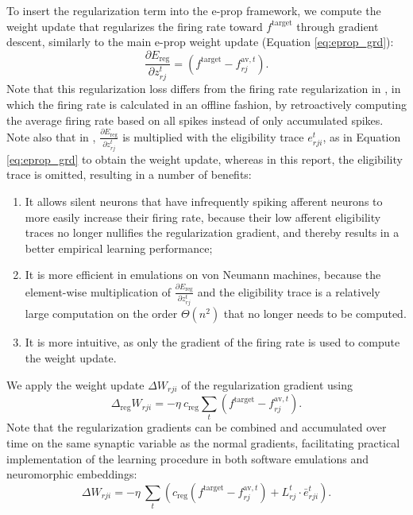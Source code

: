		To insert the regularization term into the e-prop framework, we compute the weight update that regularizes the firing rate toward $f^\text{target}$ through gradient descent, similarly to the main e-prop weight update (Equation \ref{eq:eprop_grd}):
		\begin{equation}
		\frac{\partial E_\text{reg}}{\partial z_{rj}^t} = \left(f^\text{target} - f^{\text{av}, t}_{rj}\right).
		\end{equation}
		Note that this regularization loss differs from the firing rate regularization in \citet{bellec2020solution}, in which the firing rate is calculated in an offline fashion, by retroactively computing the average firing rate based on all spikes instead of only accumulated spikes.
		Note also that in \citet{bellec2020solution}, $\frac{\partial E_\text{reg}}{\partial z_{rj}^t}$ is multiplied with the eligibility trace $e^t_{rji}$, as in Equation \ref{eq:eprop_grd} to obtain the weight update, whereas in this report, the eligibility trace is omitted, resulting in a number of benefits:
		\begin{enumerate}
			\item It allows silent neurons that have infrequently spiking afferent neurons to more easily increase their firing rate, because their low afferent eligibility traces no longer nullifies the regularization gradient, and thereby results in a better empirical learning performance;
			\item It is more efficient in emulations on von Neumann machines, because the element-wise multiplication of $\frac{\partial E_\text{reg}}{\partial z_{rj}^t}$ and the eligibility trace is a relatively large computation on the order $\Theta\!\left(n^2\right)$ that no longer needs to be computed.
			\item It is more intuitive, as only the gradient of the firing rate is used to compute the weight update.
		\end{enumerate}
		We apply the weight update $\Delta W_{rji}$ of the regularization gradient using
		\begin{equation}
		\Delta_\text{reg} W_{rji} = -\eta\ c_\text{reg}\sum_t\left(f^\text{target} - f^{\text{av}, t}_{rj}\right).
		\end{equation}
		Note that the regularization gradients can be combined and accumulated over time on the same synaptic variable as the normal gradients, facilitating practical implementation of the learning procedure in both software emulations and neuromorphic embeddings:
		\begin{equation}
		\Delta W_{rji} = -\eta\ \sum_t\left(c_\text{reg}\left(f^\text{target} - f^{\text{av}, t}_{rj}\right) + L^t_{rj}\cdot\bar{e}^t_{rji}\right).
		\end{equation}

